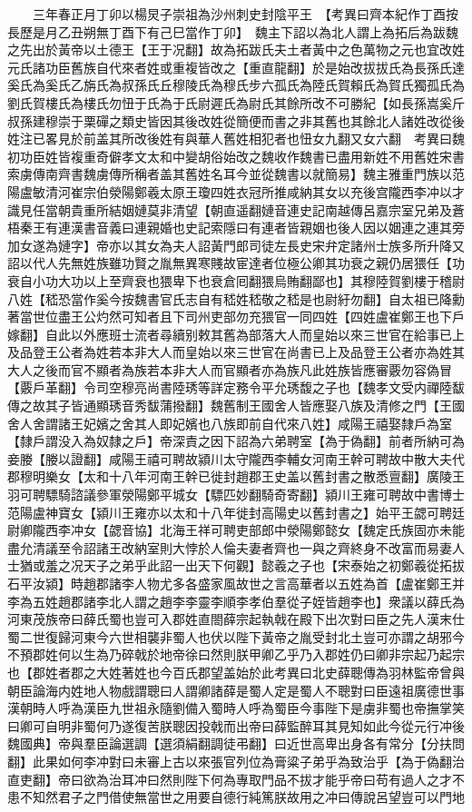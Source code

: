 　　三年春正月丁卯以楊炅子崇祖為沙州刺史封陰平王　【考異曰齊本紀作丁酉按長歷是月乙丑朔無丁酉下有己巳當作丁卯】　魏主下詔以為北人謂上為拓后為跋魏之先出於黃帝以土德王【王于况翻】故為拓跋氏夫土者黃中之色萬物之元也宜改姓元氏諸功臣舊族自代來者姓或重複皆改之【重直龍翻】於是始改拔拔氏為長孫氏達奚氏為奚氏乙旃氏為叔孫氏丘穆陵氏為穆氏步六孤氏為陸氏賀賴氏為賀氏獨孤氏為劉氏賀樓氏為樓氏勿忸于氏為于氏尉遲氏為尉氏其餘所改不可勝紀【如長孫嵩奚斤叔孫建穆崇于栗磾之類史皆因其後改姓從簡便而書之非其舊也其餘北人諸姓改從後姓注已畧見於前盖其所改後姓有與華人舊姓相犯者也忸女九翻又女六翻　考異曰魏初功臣姓皆複重奇僻孝文太和中變胡俗始改之魏收作魏書已盡用新姓不用舊姓宋書索虜傳南齊書魏虜傳所稱者盖其舊姓名耳今並從魏書以就簡易】魏主雅重門族以范陽盧敏清河崔宗伯滎陽鄭羲太原王瓊四姓衣冠所推咸納其女以充後宫隴西李冲以才識見任當朝貴重所結姻㜕莫非清望【朝直遥翻㜕音連史記南越傳呂嘉宗室兄弟及蒼梧秦王有連漢書音義曰連親婚也史記索隱曰有連者皆親姻也後人因以姻連之連其旁加女遂為㜕字】帝亦以其女為夫人詔黃門郎司徒左長史宋弁定諸州士族多所升降又詔以代人先無姓族雖功賢之胤無異寒賤故宦達者位極公卿其功衰之親仍居猥任【功衰自小功大功以上至齊衰也猥卑下也衰倉囘翻猥烏賄翻鄙也】其穆陸賀劉樓于稽尉八姓【嵇恐當作奚今按魏書官氏志自有嵇姓嵇敬之嵇是也尉紆勿翻】自太祖已降勳著當世位盡王公灼然可知者且下司州吏部勿充猥官一同四姓【四姓盧崔鄭王也下戶嫁翻】自此以外應班士流者尋續别敕其舊為部落大人而皇始以來三世官在給事已上及品登王公者為姓若本非大人而皇始以來三世官在尚書已上及品登王公者亦為姓其大人之後而官不顯者為族若本非大人而官顯者亦為族凡此姓族皆應審覈勿容偽冒【覈戶革翻】令司空穆亮尚書陸琇等詳定務令平允琇馥之子也【魏孝文受内禪陸馛傳之故其子皆通顯琇音秀馛蒲撥翻】魏舊制王國舍人皆應娶八族及清修之門【王國舍人舍謂諸王妃嬪之舍其人即妃嬪也八族即前自代來八姓】咸陽王禧娶隸戶為室【隸戶謂没入為奴隸之戶】帝深責之因下詔為六弟聘室【為于偽翻】前者所納可為妾媵【媵以證翻】咸陽王禧可聘故潁川太守隴西李輔女河南王幹可聘故中散大夫代郡穆明樂女【太和十八年河南王幹已徙封趙郡王史盖以舊封書之散悉亶翻】廣陵王羽可聘驃騎諮議參軍滎陽鄭平城女【驃匹妙翻騎奇寄翻】潁川王雍可聘故中書博士范陽盧神寶女【潁川王雍亦以太和十八年徙封高陽史以舊封書之】始平王勰可聘廷尉卿隴西李冲女【勰音協】北海王祥可聘吏部郎中滎陽鄭懿女【魏定氏族固亦未能盡允清議至令詔諸王改納室則大悖於人倫夫妻者齊也一與之齊終身不改富而易妻人士猶或羞之况天子之弟乎此詔一出天下何觀】懿羲之子也【宋泰始之初鄭羲從拓拔石平汝潁】時趙郡諸李人物尤多各盛家風故世之言高華者以五姓為首【盧崔鄭王并李為五姓趙郡諸李北人謂之趙李李靈李順李孝伯羣從子姪皆趙李也】衆議以薛氏為河東茂族帝曰薛氏蜀也豈可入郡姓直閤薛宗起執戟在殿下出次對曰臣之先人漢末仕蜀二世復歸河東今六世相襲非蜀人也伏以陛下黃帝之胤受封北土豈可亦謂之胡邪今不預郡姓何以生為乃碎戟於地帝徐曰然則朕甲卿乙乎乃入郡姓仍曰卿非宗起乃起宗也【郡姓者郡之大姓著姓也今百氏郡望盖始於此考異曰北史薛聰傳為羽林監帝曾與朝臣論海内姓地人物戲謂聰曰人謂卿諸薛是蜀人定是蜀人不聰對曰臣遠祖廣德世事漢朝時人呼為漢臣九世祖永隨劉備入蜀時人呼為蜀臣今事陛下是虜非蜀也帝撫掌笑曰卿可自明非蜀何乃遂復苦朕聰因投戟而出帝曰薛監醉耳其見知如此今從元行冲後魏國典】帝與羣臣論選調【選須絹翻調徒弔翻】曰近世高卑出身各有常分【分扶問翻】此果如何李冲對曰未審上古以來張官列位為膏粱子弟乎為致治乎【為于偽翻治直吏翻】帝曰欲為治耳冲曰然則陛下何為專取門品不拔才能乎帝曰苟有過人之才不患不知然君子之門借使無當世之用要自德行純篤朕故用之冲曰傳說呂望豈可以門地